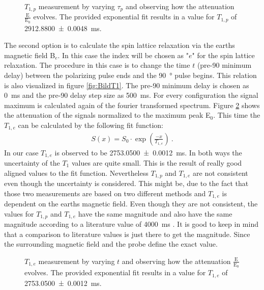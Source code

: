 \begin{figure}[H]
    \centering
    
    \caption[$T_{1,p}$ measurement by varying $\tau_p$ and observing how the attenuation $\frac{\text{E}}{\text{E}_0}$ evolves.]{$T_{1,p}$ measurement by varying $\tau_p$ and observing how the attenuation $\frac{\text{E}}{\text{E}_0}$ evolves.
    The provided exponential fit results in a value for $T_{1,p}$ of \SI{2912.8800 \pm 0.0048}{\milli \second}.}
    \label{fig:T1Polarisationsfeldfeld}
\end{figure}

The second option is to calculate the spin lattice relaxation via the earths magnetic field B$_e$.
In this case the index will be chosen as "$e$" for the spin lattice relaxation.
The procedure in this case is to change the time $t$ (pre-90 minimum delay) between the polarizing pulse ends and the \SI{90}{\degree} pulse begins.
This relation is also visualized in figure \ref{fig:BildT1}.
The pre-90 minimum delay is chosen as \SI{0}{\milli \second} and the pre-90 delay step size as \SI{500}{\milli \second}.
For every configuration the signal maximum is calculated again of the fourier transformed spectrum.
Figure \ref{fig:T1Erdmagnetfeld} shows the attenuation of the signals normalized to the maximum peak E$_0$.
This time the $T_{1,e}$ can be calculated by the following fit function:
\begin{align}
    S(x) = S_0 \cdot \exp\left(\frac{-x}{T_{1,e}}\right) \ .
    \label{eq: fitBe}
\end{align}
In our case $T_{1,e}$ is observed to be \SI{2753.0500 \pm 0.0012}{\milli \second}.\newline
In both ways the uncertainty of the $T_1$ values are quite small.
This is the result of really good aligned values to the fit function.
Nevertheless $T_{1,p}$ and $T_{1,e}$ are not consistent even though the uncertainty is considered.
This might be, due to the fact that those two measurements are based on two different methods and $T_{1,e}$ is dependent on the earths magnetic field.
Even though they are not consistent, the values for $T_{1,p}$ and $T_{1,e}$ have the same magnitude and also have the same magnitude according to a literature value of \SI{4000}{\milli \second} \cite{literaturT1}.
It is good to keep in mind that a comparison to literature values is just there to get the magnitude.
Since the surrounding magnetic field and the probe define the exact value.
\begin{figure}[H]
    \centering
    
    \caption[$T_{1,e}$ measurement by varying $t$ and observing how the attenuation $\frac{\text{E}}{\text{E}_0}$ evolves.]{$T_{1,e}$ measurement by varying $t$ and observing how the attenuation $\frac{\text{E}}{\text{E}_0}$ evolves.
    The provided exponential fit results in a value for $T_{1,e}$ of \SI{2753.0500 \pm 0.0012}{\milli \second}.}
    \label{fig:T1Erdmagnetfeld}
\end{figure}